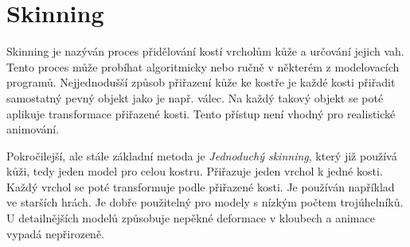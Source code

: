 \section{Skinning}
Skinning \cite{skinningMethods} je nazýván proces přidělování kostí vrcholům kůže a určování jejich vah. Tento proces může probíhat algoritmicky nebo ručně v některém z modelovacích programů. Nejjednodušší způsob přiřazení kůže ke kostře je každé kosti přiřadit samostatný pevný objekt jako je např. válec. Na každý takový objekt se poté aplikuje transformace přiřazené kosti. Tento přístup není vhodný pro realistické animování.

Pokročilejší, ale stále základní metoda je \textit{Jednoduchý skinning}, který již používá kůži, tedy jeden model pro celou kostru. Přiřazuje jeden vrchol k jedné kosti. Každý vrchol se poté transformuje podle přiřazené kosti. Je používán například ve starších hrách. Je dobře použitelný pro modely s nízkým počtem trojúhelníků. U detailnějších modelů způsobuje nepěkné deformace v kloubech a animace vypadá nepřirozeně. 

